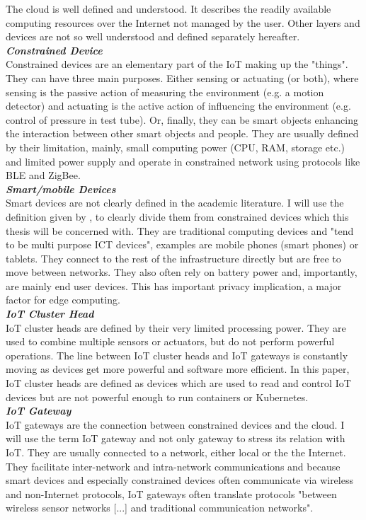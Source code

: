 The cloud is well defined and understood. It describes the readily available computing resources over the Internet not managed by the user. Other layers and devices are not so well understood and defined separately hereafter.\\[5mm]
\textbf{\textit{Constrained Device}}\\
Constrained devices are an elementary part of the IoT making up the "things"\cite{contstraintDevicesTerminology}.
They can have three main purposes. Either sensing or actuating (or both), where sensing is the 
passive action of measuring the environment (e.g. a motion detector) and actuating is the active action of influencing the environment (e.g. control of pressure in test tube). Or, finally, they can be smart objects enhancing the interaction between other smart objects and people.
They are usually defined by their limitation, mainly, small computing power (CPU, RAM, storage etc.) and limited power supply and operate in constrained network using protocols like BLE and ZigBee. \\[5mm]
\textbf{\textit{Smart/mobile Devices}}\\
Smart devices are not clearly defined in the academic literature. I will use the definition given by \citeauthor{poslad2011smartDevices}\cite{poslad2011smartDevices}, to clearly divide them from constrained devices which this thesis will be concerned with. They are traditional computing devices and "tend to be multi purpose ICT devices"\cite{poslad2011smartDevices}, examples are mobile phones (smart phones) or tablets. They connect to the rest of the infrastructure directly but are free to move between networks. They also often rely on battery power and, importantly, are mainly end user devices. This has important privacy implication, a major factor for edge computing.\\[5mm]
\textbf{\textit{IoT Cluster Head}}\\
IoT cluster heads are defined by their very limited processing power. They are used to combine multiple sensors or actuators, but do not perform powerful operations. The line between IoT cluster heads and IoT gateways is constantly moving as devices get more powerful and software more efficient. In this paper, IoT cluster heads are defined as devices which are used to read and control IoT devices but are not powerful enough to run containers or Kubernetes.\\[5mm]
\textbf{\textit{IoT Gateway}}\\
IoT gateways are the connection between constrained devices and the cloud. I will use the term IoT gateway and not only gateway to stress its relation with IoT. They are usually connected to a network, either local or the the Internet. They facilitate inter-network and intra-network communications and because smart devices and especially constrained devices often communicate via wireless and non-Internet protocols, IoT gateways often translate protocols "between wireless sensor networks [...] and traditional communication networks"\cite{zhu2010iotGatewayDefinition}.
